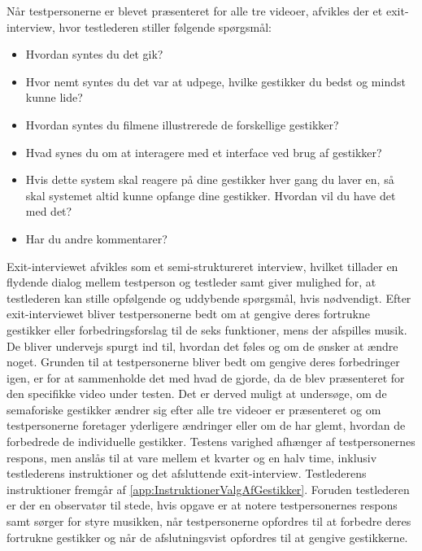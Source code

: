 Når testpersonerne er blevet præsenteret for alle tre videoer, afvikles der et exit-interview, hvor testlederen stiller følgende spørgsmål:\blankline
%
\begin{itemize}
  \item Hvordan syntes du det gik? 
  \item Hvor nemt syntes du det var at udpege, hvilke gestikker du bedst og mindst kunne lide? 
  \item Hvordan syntes du filmene illustrerede de forskellige gestikker? 
  \item Hvad synes du om at interagere med et interface ved brug af gestikker? 
  \item Hvis dette system skal reagere på dine gestikker hver gang du laver en, så skal systemet altid kunne opfange dine gestikker. Hvordan vil du have det med det? 
  \item Har du andre kommentarer?\blankline
\end{itemize}
\noindent
%
Exit-interviewet afvikles som et semi-struktureret interview, hvilket tillader en flydende dialog mellem testperson og testleder samt giver mulighed for, at testlederen kan stille opfølgende og uddybende spørgsmål, hvis nødvendigt. Efter exit-interviewet bliver testpersonerne bedt om at gengive deres fortrukne gestikker eller forbedringsforslag til de seks funktioner, mens der afspilles musik. De bliver undervejs spurgt ind til, hvordan det føles og om de ønsker at ændre noget. Grunden til at testpersonerne bliver bedt om gengive deres forbedringer igen, er for at sammenholde det med hvad de gjorde, da de blev præsenteret for den specifikke video under testen. Det er derved muligt at undersøge, om de semaforiske gestikker ændrer sig efter alle tre videoer er præsenteret og om testpersonerne foretager yderligere ændringer eller om de har glemt, hvordan de forbedrede de individuelle gestikker. \blankline   
%
Testens varighed afhænger af testpersonernes respons, men anslås til at vare mellem et kvarter og en halv time, inklusiv testlederens instruktioner og det afsluttende exit-interview. Testlederens instruktioner fremgår af \autoref{app:InstruktionerValgAfGestikker}. Foruden testlederen er der en observatør til stede, hvis opgave er at notere testpersonernes respons samt sørger for styre musikken, når testpersonerne opfordres til at forbedre deres fortrukne gestikker og når de afslutningsvist opfordres til at gengive gestikkerne. 
%
